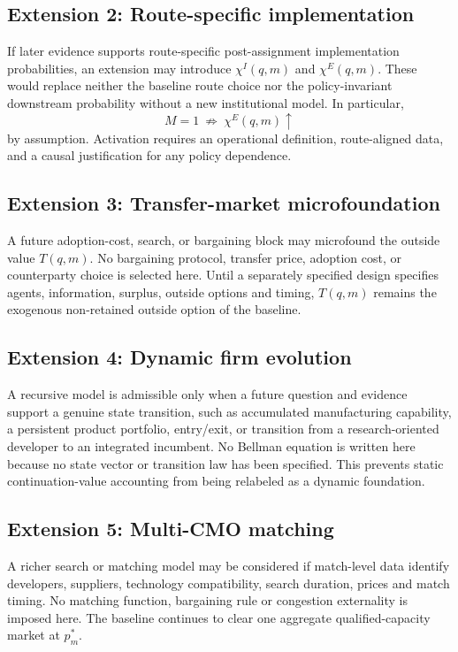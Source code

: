 \subsection{Extension 2: Route-specific implementation}
\label{subsec:p11-route-realization}

If later evidence supports route-specific post-assignment implementation
probabilities, an extension may introduce \(\chi^I(q,m)\) and
\(\chi^E(q,m)\). These would replace neither the baseline route choice nor the
policy-invariant downstream probability without a new institutional model.
In particular,
\[
  M=1
  \ \not\Rightarrow\
  \chi^E(q,m)\uparrow
\]
by assumption. Activation requires an operational definition, route-aligned
data, and a causal justification for any policy dependence.

\subsection{Extension 3: Transfer-market microfoundation}
\label{subsec:p11-transfer}

A future adoption-cost, search, or bargaining block may microfound the outside
value \(T(q,m)\). No bargaining protocol, transfer price, adoption cost, or
counterparty choice is selected here. Until a separately specified design
specifies agents, information, surplus, outside options and timing,
\(T(q,m)\) remains the exogenous non-retained outside option of the baseline.

\subsection{Extension 4: Dynamic firm evolution}
\label{subsec:p11-dynamics}

A recursive model is admissible only when a future question and evidence
support a genuine state transition, such as accumulated manufacturing
capability, a persistent product portfolio, entry/exit, or transition from a
research-oriented developer to an integrated incumbent. No Bellman equation is
written here because no state vector or transition law has been specified. This
prevents static continuation-value accounting from being relabeled as a
dynamic foundation.

\subsection{Extension 5: Multi-CMO matching}
\label{subsec:p11-matching}

A richer search or matching model may be considered if match-level data
identify developers, suppliers, technology compatibility, search duration,
prices and match timing. No matching function, bargaining rule or congestion
externality is imposed here. The baseline continues to clear one aggregate
qualified-capacity market at \(p_m^*\).

